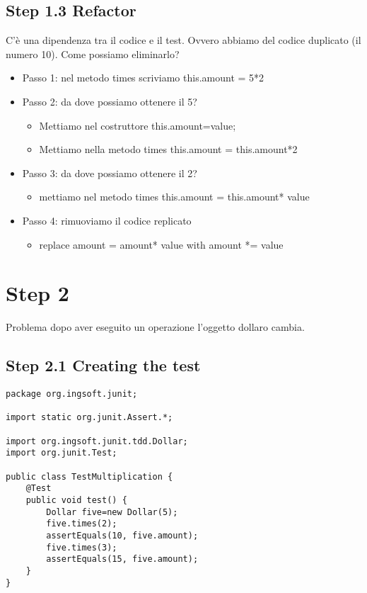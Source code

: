 \documentclass{article}
\begin{document}
\subsection {Step 1.3 Refactor}
C'\`e una dipendenza tra il codice e il test. Ovvero abbiamo del codice duplicato (il numero 10). Come possiamo eliminarlo?
\begin{itemize}
\item Passo  1: nel metodo  times scriviamo this.amount = 5*2 
\item Passo 2: da dove possiamo ottenere il 5?  
\begin{itemize}
\item Mettiamo nel costruttore this.amount=value;
\item Mettiamo nella metodo times  this.amount = this.amount*2 
\end{itemize}
\item Passo 3: da dove possiamo ottenere il 2?
\begin{itemize}
\item mettiamo nel metodo times  this.amount = this.amount* value
\end{itemize}
\item Passo 4: rimuoviamo il codice replicato
\begin{itemize}
\item  replace amount = amount* value with amount *= value
\end{itemize}
\end{itemize}

\section{Step 2}
Problema dopo aver eseguito un operazione l'oggetto dollaro cambia.
\subsection{Step 2.1 Creating the test}
\begin{lstlisting}
package org.ingsoft.junit;

import static org.junit.Assert.*;

import org.ingsoft.junit.tdd.Dollar;
import org.junit.Test;

public class TestMultiplication {
	@Test
	public void test() {
		Dollar five=new Dollar(5);
		five.times(2);
		assertEquals(10, five.amount);
		five.times(3);
		assertEquals(15, five.amount);
	}
}
\end{lstlisting}
\end{document}
